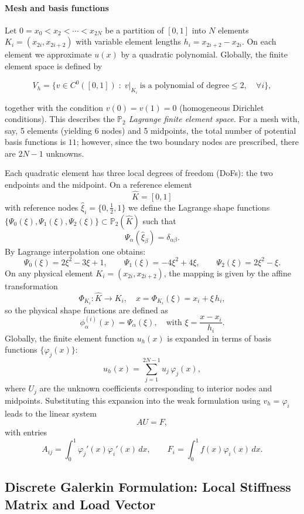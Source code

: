 \documentclass[a4paper,10pt]{report}
\begin{document}
\paragraph{Mesh and basis functions}
Let \(0=x_0<x_2<\cdots<x_{2N}\) be a partition of \([0,1]\) into \(N\) elements \(K_i=(x_{2i},x_{2i+2})\) with variable element lengths \(h_i=x_{2i+2}-x_{2i}\).
On each element we approximate \(u(x)\) by a quadratic polynomial.
Globally, the finite element space is defined by

\[
	V_h=\{v\in C^0([0,1])\;:\; v|_{K_i}\ \text{is a polynomial of degree}\le2,\quad\forall i\},
\]

together with the condition \(v(0)=v(1)=0\) (homogeneous Dirichlet conditions).
This describes the \emph{\(\mathbb{P}_2\) Lagrange finite element space}.
For a mesh with, say, 5 elements (yielding 6 nodes) and 5 midpoints, the total number of potential basis functions is \(11\);
however, since the two boundary nodes are prescribed, there are \(2N-1\) unknowns.

Each quadratic element has three local degrees of freedom (DoFs): the two endpoints and the midpoint.
On a reference element
\[
	\hat{K}=[0,1]
\]
with reference nodes \(\hat{\xi}_i=\{0,\tfrac{1}{2},1\}\) we define the Lagrange shape functions \(\{\Psi_0(\xi),\Psi_1(\xi),\Psi_2(\xi)\}\subset \mathbb{P}_2(\hat{K})\) such that
\[
	\Psi_\alpha(\hat{\xi}_\beta)=\delta_{\alpha\beta}.
\]
By Lagrange interpolation one obtains:
\[
	\Psi_0(\xi)=2\xi^2-3\xi+1,\qquad \Psi_1(\xi)=-4\xi^2+4\xi,\qquad \Psi_2(\xi)=2\xi^2-\xi.
\]
On any physical element \(K_i=(x_{2i},x_{2i+2})\), the mapping is given by the affine transformation
\[
	\Phi_{K_i}:\hat{K}\to K_i,\quad x=\Phi_{K_i}(\xi)=x_i+\xi\,h_i,
\]
so the physical shape functions are defined as
\[
	\phi_\alpha^{(i)}(x)=\Psi_\alpha(\xi),\quad \text{with } \xi=\frac{x-x_i}{h_i}.
\]
Globally, the finite element function \(u_h(x)\) is expanded in terms of basis functions \(\{\varphi_j(x)\}\):
\[
	u_h(x)=\sum_{j=1}^{2N-1} u_j\,\varphi_j(x),
\]
where \(U_j\) are the unknown coefficients corresponding to interior nodes and midpoints. Substituting this expansion into the weak formulation using \(v_h=\varphi_i\) leads to the linear system
\[
	AU=F,
\]
with entries
\[
	A_{ij}=\int_0^1\varphi_j'(x)\varphi_i'(x)\,dx,\qquad F_i=\int_0^1 f(x)\varphi_i(x)\,dx.
\]

\subsection{Discrete Galerkin Formulation: Local Stiffness Matrix and Load Vector}
\end{document}
